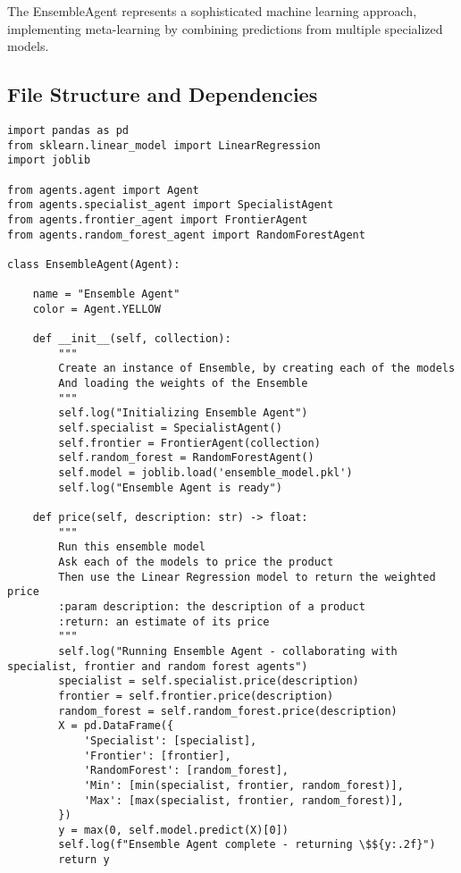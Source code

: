 The EnsembleAgent represents a sophisticated machine learning approach, implementing meta-learning by combining predictions from multiple specialized models.

\subsection{File Structure and Dependencies}
\vspace{1em}

\begin{lstlisting}[caption=ensemble\_agent.py - Complete Implementation]
import pandas as pd
from sklearn.linear_model import LinearRegression
import joblib

from agents.agent import Agent
from agents.specialist_agent import SpecialistAgent
from agents.frontier_agent import FrontierAgent
from agents.random_forest_agent import RandomForestAgent

class EnsembleAgent(Agent):

    name = "Ensemble Agent"
    color = Agent.YELLOW
    
    def __init__(self, collection):
        """
        Create an instance of Ensemble, by creating each of the models
        And loading the weights of the Ensemble
        """
        self.log("Initializing Ensemble Agent")
        self.specialist = SpecialistAgent()
        self.frontier = FrontierAgent(collection)
        self.random_forest = RandomForestAgent()
        self.model = joblib.load('ensemble_model.pkl')
        self.log("Ensemble Agent is ready")

    def price(self, description: str) -> float:
        """
        Run this ensemble model
        Ask each of the models to price the product
        Then use the Linear Regression model to return the weighted price
        :param description: the description of a product
        :return: an estimate of its price
        """
        self.log("Running Ensemble Agent - collaborating with specialist, frontier and random forest agents")
        specialist = self.specialist.price(description)
        frontier = self.frontier.price(description)
        random_forest = self.random_forest.price(description)
        X = pd.DataFrame({
            'Specialist': [specialist],
            'Frontier': [frontier],
            'RandomForest': [random_forest],
            'Min': [min(specialist, frontier, random_forest)],
            'Max': [max(specialist, frontier, random_forest)],
        })
        y = max(0, self.model.predict(X)[0])
        self.log(f"Ensemble Agent complete - returning \$${y:.2f}")
        return y
\end{lstlisting}
\vspace{1em}

